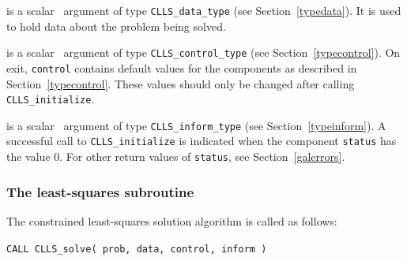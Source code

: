 \documentclass{galahad}
\newcommand{\packagename}{CLLS}
\begin{document}
\vspace*{-3mm}
\begin{description}

 is a scalar \intentinout\ argument of type
{\tt \packagename\_data\_type}
(see Section~\ref{typedata}). It is used to hold data about the problem being
solved.

 is a scalar \intentout\ argument of type
{\tt \packagename\_control\_type}
(see Section~\ref{typecontrol}).
On exit, {\tt control} contains default values for the components as
described in Section~\ref{typecontrol}.
These values should only be changed after calling
{\tt \packagename\_initialize}.

 is a scalar \intentout\ argument of type
{\tt \packagename\_inform\_type}
(see Section~\ref{typeinform}). A successful call to
{\tt \packagename\_initialize}
is indicated when the  component {\tt status} has the value 0.
For other return values of {\tt status}, see Section~\ref{galerrors}.

\end{description}


\subsubsection{The least-squares subroutine}\label{qps}
The constrained least-squares solution algorithm is called as follows:
\vspace*{1mm}

\hspace{8mm}
{\tt CALL \packagename\_solve( prob, data, control, inform )}
\end{document}
